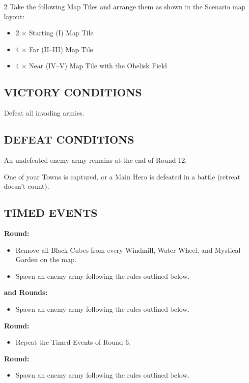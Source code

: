 \begin{multicols}{2}
Take the following Map Tiles and arrange them as shown in the Scenario map layout:

\begin{itemize}
  \item 2 × Starting (I) Map Tile
  \item 4 × Far (II--III) Map Tile
  \item 4 × Near (IV--V) Map Tile with the Obelisk Field
\end{itemize}

\subsection*{\MakeUppercase{Victory Conditions}}

Defeat all invading armies.

\subsection*{\MakeUppercase{Defeat Conditions}}

An undefeated enemy army remains at the end of Round 12.

One of your Towns is captured, or a Main Hero is defeated in a battle (retreat doesn't count).

\subsection*{\MakeUppercase{Timed Events}}

\textbf{ Round:}
\begin{itemize}
  \item Remove all Black Cubes from every Windmill, Water Wheel, and Mystical Garden on the map.
  \item Spawn an enemy army following the rules outlined below.
\end{itemize}

\textbf{ and  Rounds:}
\begin{itemize}
  \item Spawn an enemy army following the rules outlined below.
\end{itemize}

\textbf{ Round:}
\begin{itemize}
  \item Repeat the Timed Events of Round 6.
\end{itemize}

\textbf{ Round:}
\begin{itemize}
  \item Spawn an enemy army following the rules outlined below.
\end{itemize}


\end{multicols}
